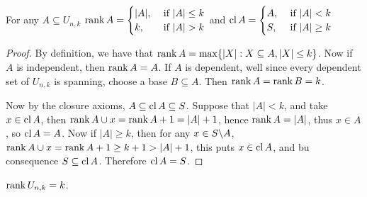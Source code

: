 \begin{corollary}
   For any $A \subseteq U_{n,k}$ $\rank{A}=\begin{cases}
                                        |A|, & \text{ if } |A| \leq k \\
                                        k, & \text{ if } |A|>k \\
                                    \end{cases}$
   and $\operatorname{cl}{A}=\begin{cases}
                    A, & \text{ if } |A|<k \\
                    S, & \text{ if } |A| \geq k \\
               \end{cases}$
\end{corollary}
\begin{proof}
    By definition, we have that $\operatorname{rank}{A}=\max\{|X|: X \subseteq A, |X|\leq k\}$. Now if $A$ is
    independent, then  $\operatorname{rank}{A}=A$. If $A$ is dependent, well since every dependent set of
    $U_{n,k}$ is spanning, choose a base $B \subseteq A$. Then  $\operatorname{rank}{A}=\operatorname{rank}{B}=k$.

    Now by the closure axioms,  $A \subseteq \operatorname{cl}{A} \subseteq S$. Suppose that $|A|<k$, and take  $x
    \in \operatorname{cl}{A}$, then $\operatorname{rank}{A \cup x}=\operatorname{rank}{A}+1=|A|+1$, hence $\operatorname{rank}{A}=|A|$, thus $x \in A$, so
$\operatorname{cl}{A}=A$. Now if $|A| \geq k$, then for any  $x \in S\backslash A$, $\operatorname{rank}{A \cup x}=\operatorname{rank}{A}+1 \geq
k+1>|A|+1$, this puts $x \in \operatorname{cl}{A}$, and bu consequence $S \subseteq \operatorname{cl}{A}$. Therefore $\operatorname{cl}{A}=S$.
\end{proof}
\begin{corollary}
    $\operatorname{rank}{U_{n,k}}=k$.
\end{corollary}

